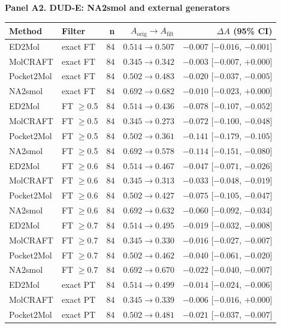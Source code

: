 \textbf{Panel A2. DUD-E: NA2smol and external generators}

\setlength{\tabcolsep}{3pt}
\scriptsize
\begin{tabular}{@{}llrrr@{}}
\toprule
\textbf{Method} & \textbf{Filter} & \textbf{n} & \textbf{$A_{\text{orig}}\to A_{\text{filt}}$} & \textbf{$\Delta A$ (95\% CI)} \\
\midrule
ED2Mol & exact FT & 84 & $0.514\to 0.507$ & $-0.007$ [$-0.016$, $-0.001$] \\
MolCRAFT & exact FT & 84 & $0.345\to 0.342$ & $-0.003$ [$-0.007$, $+0.000$] \\
Pocket2Mol & exact FT & 84 & $0.502\to 0.483$ & $-0.020$ [$-0.037$, $-0.005$] \\
NA2smol & exact FT & 84 & $0.692\to 0.682$ & $-0.010$ [$-0.023$, $+0.000$] \\
ED2Mol & FT $\geq$0.5 & 84 & $0.514\to 0.436$ & $-0.078$ [$-0.107$, $-0.052$] \\
MolCRAFT & FT $\geq$0.5 & 84 & $0.345\to 0.273$ & $-0.072$ [$-0.100$, $-0.048$] \\
Pocket2Mol & FT $\geq$0.5 & 84 & $0.502\to 0.361$ & $-0.141$ [$-0.179$, $-0.105$] \\
NA2smol & FT $\geq$0.5 & 84 & $0.692\to 0.578$ & $-0.114$ [$-0.151$, $-0.080$] \\
ED2Mol & FT $\geq$0.6 & 84 & $0.514\to 0.467$ & $-0.047$ [$-0.071$, $-0.026$] \\
MolCRAFT & FT $\geq$0.6 & 84 & $0.345\to 0.313$ & $-0.033$ [$-0.048$, $-0.019$] \\
Pocket2Mol & FT $\geq$0.6 & 84 & $0.502\to 0.427$ & $-0.075$ [$-0.105$, $-0.047$] \\
NA2smol & FT $\geq$0.6 & 84 & $0.692\to 0.632$ & $-0.060$ [$-0.092$, $-0.034$] \\
ED2Mol & FT $\geq$0.7 & 84 & $0.514\to 0.495$ & $-0.019$ [$-0.032$, $-0.008$] \\
MolCRAFT & FT $\geq$0.7 & 84 & $0.345\to 0.330$ & $-0.016$ [$-0.027$, $-0.007$] \\
Pocket2Mol & FT $\geq$0.7 & 84 & $0.502\to 0.462$ & $-0.040$ [$-0.061$, $-0.020$] \\
NA2smol & FT $\geq$0.7 & 84 & $0.692\to 0.670$ & $-0.022$ [$-0.040$, $-0.007$] \\
ED2Mol & exact PT & 84 & $0.514\to 0.499$ & $-0.014$ [$-0.024$, $-0.006$] \\
MolCRAFT & exact PT & 84 & $0.345\to 0.339$ & $-0.006$ [$-0.016$, $+0.000$] \\
Pocket2Mol & exact PT & 84 & $0.502\to 0.481$ & $-0.021$ [$-0.037$, $-0.007$] \\

\end{tabular}
